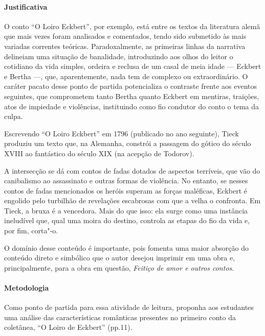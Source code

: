 \documentclass[12pt]{extarticle}
\begin{document}
\paragraph{Justificativa} O conto ``O Loiro Eckbert'', por exemplo, está entre os textos da
literatura alemã que mais vezes foram analisados e comentados, tendo
sido submetido às mais variadas correntes teóricas. Paradoxalmente, as
primeiras linhas da narrativa delineiam uma situação de banalidade,
introduzindo aos olhos do leitor o cotidiano da vida simples, ordeira e
reclusa de um casal de meia idade --- Eckbert e Bertha ---, que,
aparentemente, nada tem de complexo ou extraordinário. O caráter pacato
desse ponto de partida potencializa o contraste frente aos eventos
seguintes, que comprometem tanto Bertha quanto Eckbert em mentiras,
traições, atos de impiedade e violências, instituindo como fio condutor
do conto o tema da culpa.

Escrevendo ``O Loiro Eckbert'' em 1796 (publicado no ano seguinte),
Tieck produziu um texto que, na Alemanha, constrói a passagem do gótico
do século XVIII ao fantástico do século XIX (na acepção de Todorov).

A intersecção se dá com contos de fadas dotados de aspectos terríveis,
que vão do canibalismo ao assassinato e outras formas de violência. No
entanto, se nesses contos de fadas mencionados os heróis superam as
forças maléficas, Eckbert é engolido pelo turbilhão de revelações
escabrosas com que a velha o confronta. Em Tieck, a bruxa é a vencedora.
Mais do que isso: ela surge como uma instância ineludível que, qual uma
moira do destino, controla as etapas do fio da vida e, por fim, corta"-o.

O domínio desse conteúdo é importante, pois fomenta uma maior absorção do conteúdo 
direto e simbólico que o autor desejou imprimir em uma obra e, principalmente, 
para a obra em questão, \textit{Feitiço de amor e outros contos}.

\paragraph{Metodologia}
Como ponto de partida para essa atividade de leitura, proponha aos estudantes 
uma análise das características românticas presentes no primeiro conto da 
coletânea, ``O Loiro de Eckbert'' (pp.11).
\end{document}
